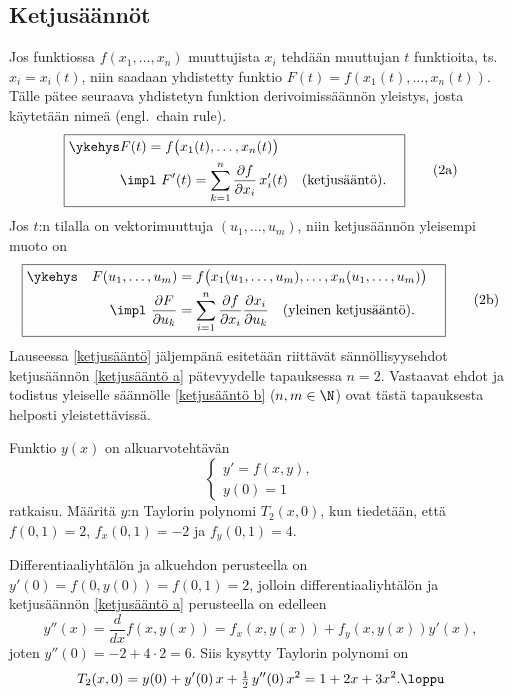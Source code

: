 \subsection{Ketjusäännöt}

Jos funktiossa $f(x_1,\ldots,x_n)$ muuttujista $x_i$ tehdään muuttujan $t$ funktioita, ts.\
$x_i=x_i(t)$, niin saadaan yhdistetty funktio $F(t)=f(x_1(t),\ldots,x_n(t))$. Tälle pätee
seuraava yhdistetyn funktion derivoimissäännön yleistys, josta käytetään nimeä
\kor{ketjusääntö} (engl.\ chain rule).
\begin{equation} \label{ketjusääntö a}
\boxed{
\begin{aligned}
\ykehys &F(t) = f\bigl(x_1(t),\ldots,x_n(t)\bigr) \quad \\
  \quad &\impl \ F'(t) = \sum_{k=1}^n \frac{\partial f}{\partial x_i}\,x_i'(t) 
               \quad \text{(ketjusääntö)}. \quad
\end{aligned}} \tag{2a}
\end{equation}
Jos $t$:n tilalla on vektorimuuttuja $(u_1,\ldots,u_m)$, niin ketjusäännön yleisempi muoto on
\begin{equation} \label{ketjusääntö b}
\boxed{
\begin{aligned} \ykehys\quad 
F(u_1,\ldots,u_m) &= f\bigl(x_1(u_1,\ldots,u_m),\ldots,x_n(u_1,\ldots,u_m)\bigr) \quad \\
\impl \ \frac{\partial F}{\partial u_k} &= \sum_{i=1}^n \frac{\partial f}{\partial x_i}
\frac{\partial x_i}{\partial u_k} \quad \text{(yleinen ketjusääntö)}.
\end{aligned}} \tag{2b}
\end{equation}
Lauseessa \ref{ketjusääntö} jäljempänä esitetään riittävät sännöllisyysehdot ketjusäännön
\eqref{ketjusääntö a} pätevyydelle tapauksessa $n=2$. Vastaavat ehdot ja todistus yleiselle
säännölle \eqref{ketjusääntö b} ($n,m\in\N$) ovat tästä tapauksesta helposti yleistettävissä.
\begin{Exa} Funktio $y(x)$ on alkuarvotehtävän 
\[ \begin{cases} y' = f(x,y), \\ y(0)=1 \end{cases} \]
ratkaisu. Määritä $y$:n Taylorin polynomi $T_2(x,0)$, kun tiedetään, että $f(0,1)=2$,
$f_x(0,1)=-2$ ja $f_y(0,1)=4$.
\end{Exa}
\ratk Differentiaaliyhtälön ja alkuehdon perusteella on $y'(0)=f(0,y(0))=f(0,1)=2$, jolloin
differentiaaliyhtälön ja ketjusäännön \eqref{ketjusääntö a} perusteella on edelleen
\[ 
y''(x) = \frac{d}{dx} f(x,y(x)) = f_x(x,y(x)) + f_y(x,y(x))y'(x), 
\]
joten $y''(0) = -2 + 4 \cdot 2 = 6$. Siis kysytty Taylorin polynomi on
\[ 
T_2(x,0) = y(0) + y'(0)\,x + \tfrac{1}{2}\,y''(0)\,x^2 = 1+2x+3x^2. \loppu 
\]

